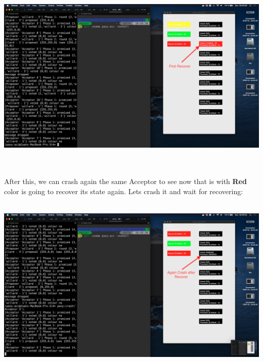 \documentclass[a4paper, 10pt]{article}
\begin{document}
\begin{minipage}[t]{\linewidth}
  \centering
  \includegraphics[width=\textwidth]{1recover_acc3}
\end{minipage}\\\\

After this, we can crash again the same Acceptor to see now that is with
\textbf{Red} color is going to recover its state again. Lets crash it and wait
for recovering:\\\\

\begin{minipage}[t]{\linewidth}
  \centering
  \includegraphics[width=\textwidth]{2crash_acc3}
\end{minipage}\\\\
\end{document}
